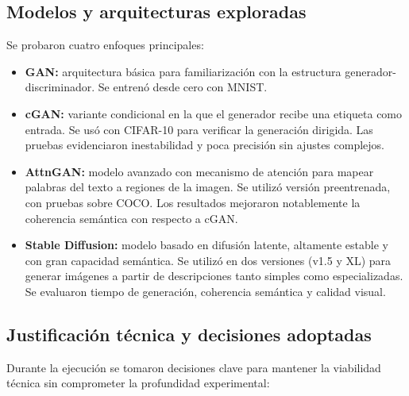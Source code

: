 \subsection{Modelos y arquitecturas exploradas}

Se probaron cuatro enfoques principales:

\begin{itemize}
\item \textbf{GAN:} arquitectura básica para familiarización con la estructura generador-discriminador. Se entrenó desde cero con MNIST.


\item \textbf{cGAN:} variante condicional en la que el generador recibe una etiqueta como entrada. Se usó con CIFAR-10 para verificar la generación dirigida. Las pruebas evidenciaron inestabilidad y poca precisión sin ajustes complejos.

\item \textbf{AttnGAN:} modelo avanzado con mecanismo de atención para mapear palabras del texto a regiones de la imagen. Se utilizó versión preentrenada, con pruebas sobre COCO. Los resultados mejoraron notablemente la coherencia semántica con respecto a cGAN.

\item \textbf{Stable Diffusion:} modelo basado en difusión latente, altamente estable y con gran capacidad semántica. Se utilizó en dos versiones (v1.5 y XL) para generar imágenes a partir de descripciones tanto simples como especializadas. Se evaluaron tiempo de generación, coherencia semántica y calidad visual.

\end{itemize}

\subsection{Justificación técnica y decisiones adoptadas}

Durante la ejecución se tomaron decisiones clave para mantener la viabilidad técnica sin comprometer la profundidad experimental:

